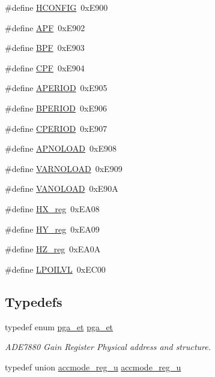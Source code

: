 \begin{DoxyCompactItemize}
\item 
\#define \hyperlink{a00036_a785b8c7df7ac430278aa1e89c0db69d9}{H\-C\-O\-N\-F\-I\-G}~0x\-E900
\item 
\#define \hyperlink{a00036_a046922a73acdd40d28809894a32f66de}{A\-P\-F}~0x\-E902
\item 
\#define \hyperlink{a00036_ae7ae297d8b0013c4e3dc550dc3e840cc}{B\-P\-F}~0x\-E903
\item 
\#define \hyperlink{a00036_ac872290e70cb6bf2b018d9e6b441216b}{C\-P\-F}~0x\-E904
\item 
\#define \hyperlink{a00036_a6a1f5b0cbc6fa43b08b3e0837a848e5b}{A\-P\-E\-R\-I\-O\-D}~0x\-E905
\item 
\#define \hyperlink{a00036_a213e16d4dd273764e3812a8c55242f99}{B\-P\-E\-R\-I\-O\-D}~0x\-E906
\item 
\#define \hyperlink{a00036_ad089734d1b0b03f6256cd3004b6127ce}{C\-P\-E\-R\-I\-O\-D}~0x\-E907
\item 
\#define \hyperlink{a00036_af3cf7b8f5e0068d118ba353733b37057}{A\-P\-N\-O\-L\-O\-A\-D}~0x\-E908
\item 
\#define \hyperlink{a00036_add44e087f0f18c22c64adefc3cd8e7c6}{V\-A\-R\-N\-O\-L\-O\-A\-D}~0x\-E909
\item 
\#define \hyperlink{a00036_a1d6674e575747b429aa04d0ad94b7290}{V\-A\-N\-O\-L\-O\-A\-D}~0x\-E90\-A
\item 
\#define \hyperlink{a00036_a206f6fe198ba53389de628f12ac30886}{H\-X\-\_\-reg}~0x\-E\-A08
\item 
\#define \hyperlink{a00036_a9ede8f30bf9b21236bcc1d43fac0d18b}{H\-Y\-\_\-reg}~0x\-E\-A09
\item 
\#define \hyperlink{a00036_ac2c2eb2bf06da994f80b7c84a98fbbff}{H\-Z\-\_\-reg}~0x\-E\-A0\-A
\item 
\#define \hyperlink{a00036_a7ad463156ea585050f4f3516081208c8}{L\-P\-O\-I\-L\-V\-L}~0x\-E\-C00
\end{DoxyCompactItemize}
\subsection*{Typedefs}
\begin{DoxyCompactItemize}
\item 
typedef enum \hyperlink{a00036_ad9e71b7c5a4b7598dfea38b40734d96f}{pga\-\_\-et} \hyperlink{a00036_a07511a3a5ff578314792d6df1c7cc5e4}{pga\-\_\-et}
\begin{DoxyCompactList}\small\item\em A\-D\-E7880 Gain Register Physical address and structure. \end{DoxyCompactList}\item 
typedef union \hyperlink{a00010}{accmode\-\_\-reg\-\_\-u} \hyperlink{a00036_ac9ade8535a4f8c8b65b447e7aaac2700}{accmode\-\_\-reg\-\_\-u}
\end{DoxyCompactItemize}
